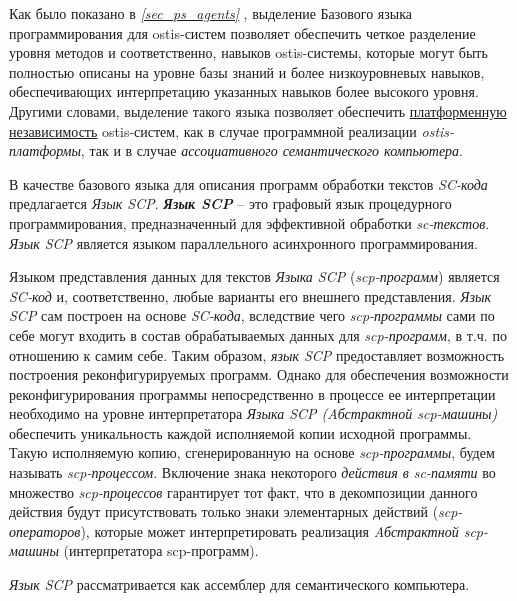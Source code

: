 Как было показано в \textit{\ref{sec_ps_agents} }, выделение Базового языка программирования для ostis-систем позволяет обеспечить четкое разделение уровня методов и соответственно, навыков ostis-системы, которые могут быть полностью описаны на уровне базы знаний и более низкоуровневых навыков, обеспечивающих интерпретацию указанных навыков более высокого уровня. Другими словами, выделение такого языка позволяет обеспечить \uline{платформенную независимость} ostis-систем, как в случае программной реализации \textit{ostis-платформы}, так и в случае \textit{ассоциативного семантического компьютера}.

В качестве базового языка для описания программ обработки текстов \textit{SC-кода} предлагается \textit{Язык SCP}. \textbf{\textit{Язык SCP}} -- это графовый язык процедурного программирования, предназначенный для эффективной обработки \textit{sc-текстов}. \textit{Язык SCP} является языком параллельного асинхронного программирования.

\begin{SCn}
\end{SCn}

Языком представления данных для текстов \textit{Языка SCP}
(\textit{scp-программ}) является \textit{SC-код} и, соответственно, любые варианты его внешнего представления. \textit{Язык SCP} сам построен на основе \textit{SC-кода}, вследствие чего \textit{scp-программы} сами по себе могут входить в состав обрабатываемых данных для \textit{scp-программ}, в т.ч. по отношению к самим себе. Таким образом, \textit{язык SCP} предоставляет возможность построения реконфигурируемых программ. Однако для обеспечения возможности реконфигурирования программы непосредственно в процессе ее интерпретации необходимо на уровне интерпретатора \textit{Языка SCP (Aбстрактной scp-машины)} обеспечить уникальность каждой исполняемой копии исходной программы. Такую исполняемую копию, сгенерированную на основе \textit{scp-программы}, будем называть \textit{scp-процессом}.
Включение знака некоторого \textit{действия в sc-памяти} во множество \textit{scp-процессов} гарантирует тот факт, что в декомпозиции данного действия будут присутствовать только знаки элементарных действий (\textit{scp-операторов}), которые может интерпретировать реализация \textit{Aбстрактной scp-машины} (интерпретатора scp-программ).

\textit{Язык SCP} рассматривается как ассемблер для семантического компьютера.

